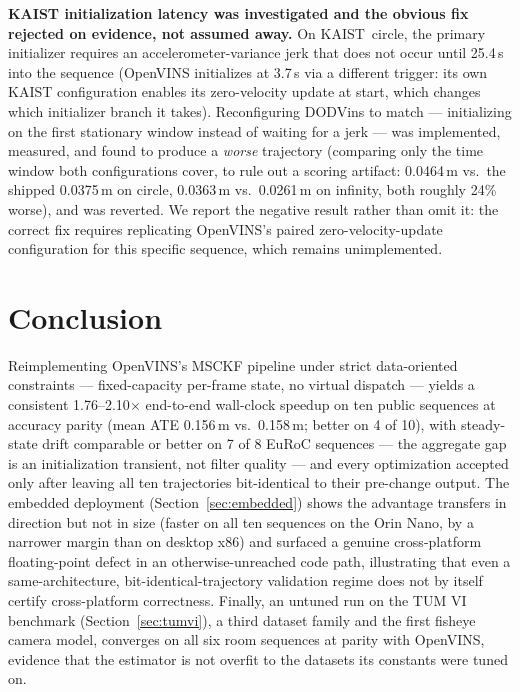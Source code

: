 \documentclass[10pt,conference,letterpaper]{IEEEtran}
\begin{document}
\textbf{KAIST initialization latency was investigated and the obvious fix
rejected on evidence, not assumed away.} On KAIST~circle, the primary
initializer requires an accelerometer-variance jerk that does not occur
until 25.4\,s into the sequence (OpenVINS initializes at 3.7\,s via a
different trigger: its own KAIST configuration enables its zero-velocity
update at start, which changes which initializer branch it takes).
Reconfiguring DODVins to match --- initializing on the first
stationary window instead of waiting for a jerk --- was implemented,
measured, and found to produce a \emph{worse} trajectory (comparing only the
time window both configurations cover, to rule out a scoring artifact:
0.0464\,m vs.\ the shipped 0.0375\,m on circle, 0.0363\,m vs.\ 0.0261\,m on
infinity, both roughly 24\% worse), and was reverted. We report the negative
result rather than omit it: the correct fix requires replicating
OpenVINS's paired zero-velocity-update configuration for this specific
sequence, which remains unimplemented.

\section{Conclusion}

Reimplementing OpenVINS's MSCKF pipeline under strict data-oriented
constraints --- fixed-capacity per-frame state, no virtual dispatch ---
yields a consistent 1.76--2.10$\times$ end-to-end wall-clock speedup on
ten public sequences at accuracy parity (mean ATE 0.156\,m vs.\
0.158\,m; better on 4 of 10), with steady-state drift comparable or
better on 7 of 8 EuRoC sequences --- the aggregate gap is an
initialization transient, not filter quality --- and every optimization
accepted only after leaving all ten trajectories bit-identical to their
pre-change output. The embedded deployment (Section~\ref{sec:embedded})
shows the advantage
transfers in direction but not in size (faster on all ten sequences on
the Orin Nano, by a narrower margin than on desktop x86) and surfaced a
genuine cross-platform floating-point defect in an otherwise-unreached code
path, illustrating that even a same-architecture, bit-identical-trajectory
validation regime does not by itself certify cross-platform correctness.
Finally, an untuned run on the TUM VI benchmark
(Section~\ref{sec:tumvi}), a third dataset family and the first fisheye
camera model, converges on all six room sequences at parity with
OpenVINS, evidence that the estimator is not overfit to the datasets its
constants were tuned on.
\end{document}
